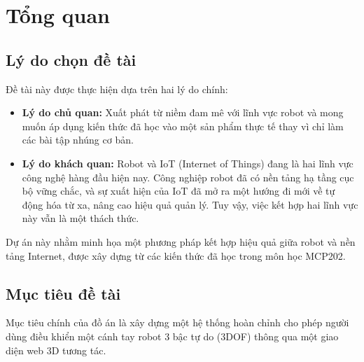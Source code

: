 \documentclass[12pt, a4paper, oneside]{report}
\numberwithin{equation}{chapter} %
\numberwithin{figure}{chapter}   %
\numberwithin{table}{chapter}    %
\begin{document}
\chapter{Tổng quan}

\section{Lý do chọn đề tài}

Đề tài này được thực hiện dựa trên hai lý do chính:

\begin{itemize}
    \item \textbf{Lý do chủ quan:} Xuất phát từ niềm đam mê với lĩnh vực robot và mong muốn áp dụng kiến thức đã học vào một sản phẩm thực tế thay vì chỉ làm các bài tập nhúng cơ bản.
    \item \textbf{Lý do khách quan:} Robot và IoT (Internet of Things) đang là hai lĩnh vực công nghệ hàng đầu hiện nay. Công nghiệp robot đã có nền tảng hạ tầng cục bộ vững chắc, và sự xuất hiện của IoT đã mở ra một hướng đi mới về tự động hóa từ xa, nâng cao hiệu quả quản lý. Tuy vậy, việc kết hợp hai lĩnh vực này vẫn là một thách thức.
\end{itemize}

Dự án này nhằm minh họa một phương pháp kết hợp hiệu quả giữa robot và nền tảng Internet, được xây dựng từ các kiến thức đã học trong môn học MCP202.

\section{Mục tiêu đề tài}

Mục tiêu chính của đồ án là xây dựng một hệ thống hoàn chỉnh cho phép người dùng điều khiển một cánh tay robot 3 bậc tự do (3DOF) thông qua một giao diện web 3D tương tác.
\end{document}
